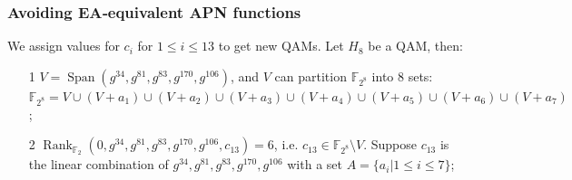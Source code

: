 \documentclass[
    aspectratio=169,                   %
]{beamer}
\newcommand{\F}{\mathbb{F}}
\begin{document}
    \begin{frame}
        \frametitle{Avoiding EA‑equivalent APN functions}
    
        \begin{example}
            We assign values for $ c_i $ for $ 1\le i\le 13 $ to get new QAMs. Let $ H_8 $ be a QAM, then:
            \begin{enumerate}
                \item[1] $ V=\operatorname{Span}(g^{34}, g^{81} , g^{83}, g^{170} ,g^{106}) $, and $ V $ can partition 
                $ \F_{2^8} $ into $ 8 $ sets: $ \F_{2^8}=V\cup(V+a_1)\cup(V+a_2)\cup(V+a_3)\cup(V+a_4)\cup(V+a_5)\cup(V+a_6)\cup(V+a_7) $;
                \item[2] $ \operatorname{Rank}_{\F_2}(0,g^{34}, g^{81} , g^{83}, g^{170} ,g^{106},c_{13})=6 $, 
                i.e. $ c_{13}\in\F_{2^8}\setminus V $.
                Suppose $ c_{13} $ is the linear combination of $ g^{34}, g^{81} , g^{83}, g^{170} ,g^{106} $ with
                a set $ A=\{a_i|1\le i\le 7\} $;
            \end{enumerate}
        \end{example}
    \end{frame}
\end{document}
